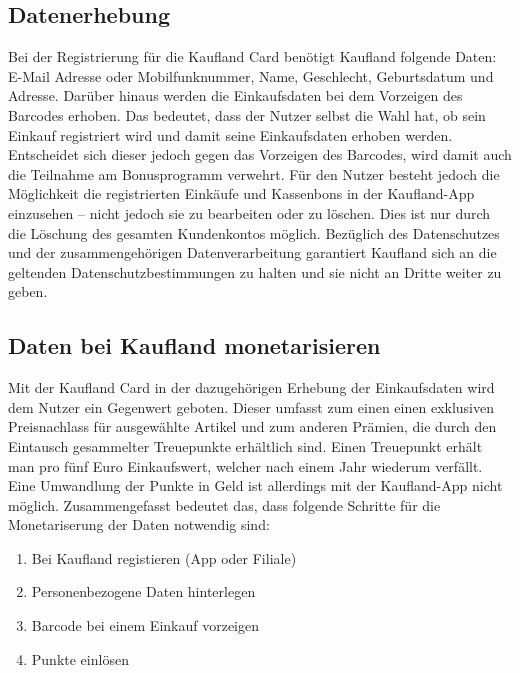 \subsection{Datenerhebung}
Bei der Registrierung für die Kaufland Card benötigt Kaufland folgende Daten: E-Mail Adresse oder Mobilfunknummer, Name, Geschlecht, Geburtsdatum und Adresse. Darüber hinaus werden die Einkaufsdaten bei dem Vorzeigen des Barcodes erhoben. Das bedeutet, dass der Nutzer selbst die Wahl hat, ob sein Einkauf registriert wird und damit seine Einkaufsdaten erhoben werden. Entscheidet sich dieser jedoch gegen das Vorzeigen des Barcodes, wird damit auch die Teilnahme am Bonusprogramm verwehrt. Für den Nutzer besteht jedoch die Möglichkeit die registrierten Einkäufe und Kassenbons in der Kaufland-App einzusehen -- nicht jedoch sie zu bearbeiten oder zu löschen. Dies ist nur durch die Löschung des gesamten Kundenkontos möglich. \cite{Kaufland_FAQ} Bezüglich des Datenschutzes und der zusammengehörigen Datenverarbeitung garantiert Kaufland sich an die geltenden Datenschutzbestimmungen zu halten und sie nicht an Dritte weiter zu geben. \cite{Kaufland_Rechtliches} 

\subsection{Daten bei Kaufland monetarisieren}
Mit der Kaufland Card in der dazugehörigen Erhebung der Einkaufsdaten wird dem Nutzer ein Gegenwert geboten. Dieser umfasst zum einen einen exklusiven Preisnachlass für ausgewählte Artikel und zum anderen Prämien, die durch den Eintausch gesammelter Treuepunkte erhältlich sind. Einen Treuepunkt erhält man pro fünf Euro Einkaufswert, welcher nach einem Jahr wiederum verfällt. Eine Umwandlung der Punkte in Geld ist allerdings mit der Kaufland-App nicht möglich. \cite{Kaufland_FAQ} Zusammengefasst bedeutet das, dass folgende Schritte für die Monetariserung der Daten notwendig sind:

\begin{enumerate}
	\item Bei Kaufland registieren (App oder Filiale) 
	\item Personenbezogene Daten hinterlegen
	\item Barcode bei einem Einkauf vorzeigen
	\item Punkte einlösen
\end{enumerate}
